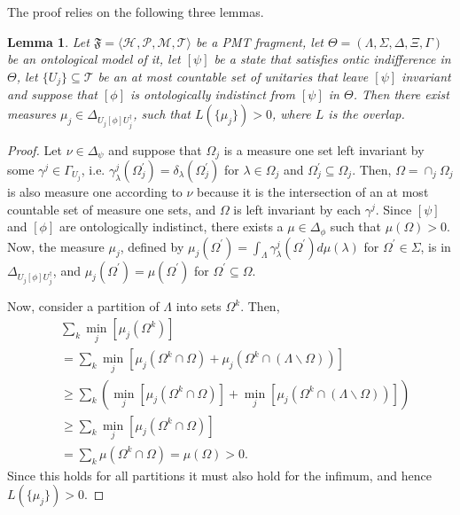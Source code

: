 \documentclass[DIV=calc,fontsize=12pt]{scrartcl} %
\theoremstyle{definition}
\theoremstyle{plain}
\newtheorem{lemma}[definition]{Lemma}
\newcommand{\Proj}[1]{\ensuremath{\left [ #1 \right ]}}
\newcommand{\Hilb}[1][]{\ensuremath{\mathcal{H}_{#1}}}
\begin{document}
The proof relies on the following three lemmas.
\begin{lemma}
\label{lem:Hardy:overlap}
Let $\mathfrak{F} = \langle \Hilb, \mathcal{P}, \mathcal{M},
\mathcal{T} \rangle$ be a PMT fragment, let $\Theta = (\Lambda, \Sigma,
\Delta, \Xi, \Gamma)$ be an ontological model of it, let
$\Proj{\psi}$ be a state that satisfies ontic indifference in $\Theta$,
let $\{U_j\} \subseteq \mathcal{T}$ be an at most countable set of
unitaries that leave $\Proj{\psi}$ invariant and suppose that
$\Proj{\phi}$ is ontologically indistinct from $\Proj{\psi}$ in
$\Theta$.  Then there exist measures $\mu_j \in \Delta_{U_j
\Proj{\phi}U_j^{\dagger}}$, such that $L(\{\mu_j\}) > 0$, where
$L$ is the overlap.
\end{lemma}
\begin{proof}
Let $\nu \in \Delta_{\psi}$ and suppose that $\Omega_j$ is a measure
one set left invariant by some $\gamma^j \in \Gamma_{U_j}$,
i.e. $\gamma^j_{\lambda}(\Omega_j^{\prime}) =
\delta_{\lambda}(\Omega_j^{\prime})$ for $\lambda \in \Omega_j$ and
$\Omega_j^{\prime} \subseteq \Omega_j$.  Then, $\Omega = \cap_j
\Omega_j$ is also measure one according to $\nu$ because it is the
intersection of an at most countable set of measure one sets, and
$\Omega$ is left invariant by each $\gamma^j$.  Since $\Proj{\psi}$
and $\Proj{\phi}$ are ontologically indistinct, there exists a $\mu
\in \Delta_{\phi}$ such that $\mu(\Omega) > 0$.  Now, the measure
$\mu_j$, defined by $\mu_j(\Omega^{\prime}) = \int_{\Lambda}
\gamma^j_{\lambda}(\Omega^{\prime}) d\mu(\lambda)$ for
$\Omega^{\prime} \in \Sigma$, is in $\Delta_{U_j
\Proj{\phi}U_j^{\dagger}}$, and $\mu_j(\Omega^{\prime}) =
\mu(\Omega^{\prime})$ for $\Omega^{\prime} \subseteq \Omega$.

Now, consider a partition of $\Lambda$ into sets $\Omega^k$.  Then,
\begin{align}
&\sum_k \min_j \left [ \mu_j(\Omega^k )\right ] \nonumber\\
& = \sum_k \min_j
\left [ \mu_j \left ( \Omega^k \cap \Omega \right ) + \mu_j \left
( \Omega^k \cap \left ( \Lambda \backslash \Omega \right )
\right ) \right ] \\
& \geq \sum_k \left ( \min_j \left [ \mu_j \left ( \Omega^k \cap
\Omega \right ) \right ] + \min_j \left [ \mu_j \left (
\Omega^k \cap \left ( \Lambda
\backslash \Omega \right ) \right ) \right ] \right ) \\
& \geq \sum_k \min_j \left [ \mu_j \left ( \Omega^k \cap \Omega
\right ) \right ] \\
& = \sum_k \mu(\Omega^k \cap \Omega) = \mu(\Omega) > 0.
\end{align}
Since this holds for all partitions it must also hold for the
infimum, and hence $L(\{\mu_j\}) > 0$.
\end{proof}
\end{document}
